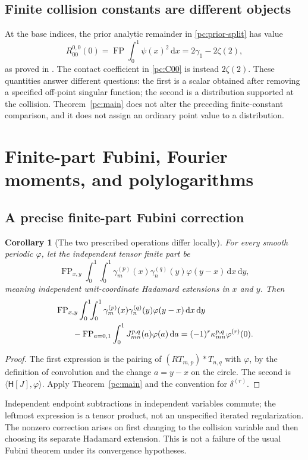 \documentclass[11pt,a4paper]{article}
\numberwithin{equation}{section}
\newtheorem{corollary}[theorem]{Corollary}
\theoremstyle{definition}
\newcommand{\dd}{\,\mathrm d}
\newcommand{\FP}{\operatorname{FP}}
\newcommand{\HH}{\mathsf H}
\begin{document}
\subsection{Finite collision constants are different objects}
At the base indices, the prior analytic remainder in \eqref{pc:prior-split} has value
\[
R_{00}^{0,0}(0)=\FP\int_0^1\psi(x)^2\dd x
=2\gamma_1-2\zeta(2),
\]
as proved in \cite{pc:coincident}. The contact coefficient in \eqref{pc:C00} is instead $2\zeta(2)$. These quantities answer different questions: the first is a scalar obtained after removing a specified off-point singular function; the second is a distribution supported at the collision. Theorem~\ref{pc:main} does not alter the preceding finite-constant comparison, and it does not assign an ordinary point value to a distribution.

\section{Finite-part Fubini, Fourier moments, and polylogarithms}\label{pc:fourier-section}
\subsection{A precise finite-part Fubini correction}
\begin{corollary}[The two prescribed operations differ locally]\label{pc:fubini}
For every smooth periodic $\varphi$, let the independent tensor finite part be
\[
\FP_{x,y}\int_0^1\!\!\int_0^1
\gamma_m^{(p)}(x)\gamma_n^{(q)}(y)\varphi(y-x)\dd x\dd y,
\]
meaning independent unit-coordinate Hadamard extensions in $x$ and $y$. Then
\begin{align}
&\FP_{x,y}\int_0^1\!\!\int_0^1
\gamma_m^{(p)}(x)\gamma_n^{(q)}(y)\varphi(y-x)\dd x\dd y\notag\\
&\qquad-\FP_{a=0,1}\int_0^1J_{mn}^{p,q}(a)\varphi(a)\dd a
=(-1)^r\kappa_{mn}^{p,q}\varphi^{(r)}(0).\label{pc:fubini-formula}
\end{align}
\end{corollary}
\begin{proof}
The first expression is the pairing of $(RT_{m,p})*T_{n,q}$ with $\varphi$, by the definition of convolution and the change $a=y-x$ on the circle. The second is $\langle\HH[J],\varphi\rangle$. Apply Theorem~\ref{pc:main} and the convention for $\delta^{(r)}$.
\end{proof}
Independent endpoint subtractions in independent variables commute; the leftmost expression is a tensor product, not an unspecified iterated regularization. The nonzero correction arises on first changing to the collision variable and then choosing its separate Hadamard extension. This is not a failure of the usual Fubini theorem under its convergence hypotheses.
\end{document}
